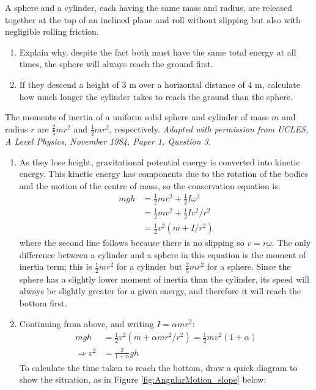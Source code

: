 \begin{hint}
{
A sphere and a cylinder, each having the same mass and radius, are released together at the top of an inclined plane and roll without slipping but also with negligible rolling friction.
\begin{enumerate}
\item Explain why, despite the fact both must have the same total energy at all times, the sphere will always reach the ground first. 
\item If they descend a height of $3\textrm{ m}$ over a horizontal distance of $4\textrm{ m}$, calculate how much longer the cylinder takes to reach the ground than the sphere. 
\end{enumerate}
}
{The moments of inertia of a uniform solid sphere and cylinder of mass $m$ and radius $r$ are $\frac{2}{5}mr^2$ and $\frac{1}{2}mr^2$, respectively.}
{\textit{Adapted with permission from UCLES, A Level Physics, November 1984, Paper 1, Question 3.}}
{
\begin{enumerate}
\item
As they lose height, gravitational potential energy is converted into kinetic energy. This kinetic energy has components due to the rotation of the bodies and the motion of the centre of mass, so the conservation equation is:
\begin{align*}
mgh&=\frac{1}{2}mv^2+\frac{1}{2}I\omega^2 \\
&=\frac{1}{2}mv^2+\frac{1}{2}Iv^2/r^2 \\
&=\frac{1}{2}v^2\left(m+I/r^2\right)
\end{align*}
where the second line follows because there is no slipping so $v=r\omega$. The only difference between a cylinder and a sphere in this equation is the moment of inertia term; this is $\frac{1}{2}mr^2$ for a cylinder but $\frac{2}{5}mr^2$ for a sphere. Since the sphere has a slightly lower moment of inertia than the cylinder, its speed will always be slightly greater for a given energy, and therefore it will reach the bottom first.
\item Continuing from above, and writing $I=\alpha mr^2$:
\begin{align*}
mgh&=\frac{1}{2}v^2\left(m+\alpha mr^2/r^2\right)=\frac{1}{2}mv^2\left(1+\alpha\right) \\
\Rightarrow v^2&=\frac{2}{1+\alpha}gh
\end{align*}
To calculate the time taken to reach the bottom, draw a quick diagram to show the situation, as in Figure \ref{fig:AngularMotion_slope} below: 

\end{enumerate}}
\end{hint}

